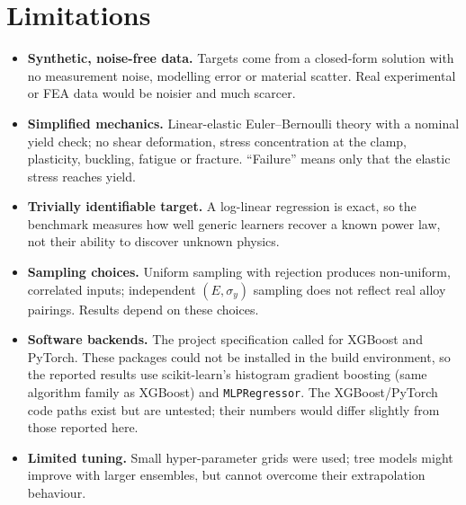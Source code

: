 \documentclass[11pt,a4paper]{article}
\begin{document}
\section{Limitations}
\begin{itemize}
\item \textbf{Synthetic, noise-free data.} Targets come from a closed-form solution with no measurement noise, modelling
error or material scatter. Real experimental or FEA data would be noisier and much scarcer.
\item \textbf{Simplified mechanics.} Linear-elastic Euler--Bernoulli theory with a nominal yield check; no shear
deformation, stress concentration at the clamp, plasticity, buckling, fatigue or fracture. ``Failure'' means only that
the elastic stress reaches yield.
\item \textbf{Trivially identifiable target.} A log-linear regression is exact, so the benchmark measures how well generic
learners recover a known power law, not their ability to discover unknown physics.
\item \textbf{Sampling choices.} Uniform sampling with rejection produces non-uniform, correlated inputs; independent
$(E,\sigma_y)$ sampling does not reflect real alloy pairings. Results depend on these choices.
\item \textbf{Software backends.} The project specification called for XGBoost and PyTorch. These packages could not be installed in the build environment, so the reported results use scikit-learn's histogram gradient boosting (same algorithm family as XGBoost) and \texttt{MLPRegressor}. The XGBoost/PyTorch code paths exist but are untested; their numbers would differ slightly from those reported here.
\item \textbf{Limited tuning.} Small hyper-parameter grids were used; tree models might improve with larger ensembles,
but cannot overcome their extrapolation behaviour.
\end{itemize}

\end{document}
